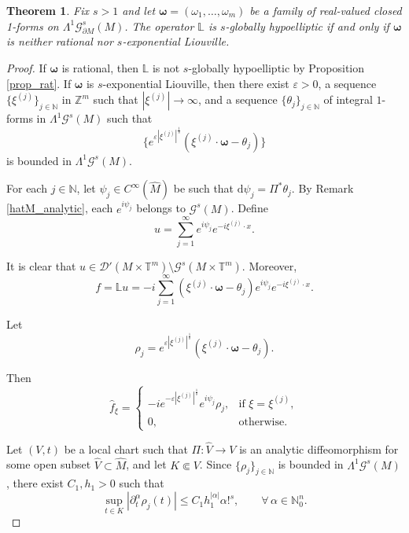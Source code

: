 \documentclass[11pt,reqno]{amsart}
\numberwithin{equation}{section}
\newtheorem{theorem}{Theorem}[section]
\begin{document}
\begin{theorem}\label{gh_roumieu}
	Fix $s>1$ and let $\boldsymbol{\omega}=(\omega_1,\dots,\omega_m)$ be a family of real-valued closed 1-forms on $\mathsf{\Lambda}^1\mathscr{G}^s_{\partial M}(M)$. The operator $\mathbb{L}$ is $s$-globally hypoelliptic 
	if and only if $\boldsymbol{\omega}$ is neither rational nor $s$-exponential Liouville.
\end{theorem}
\begin{proof}
	
	If $\boldsymbol{\omega}$ is rational, then $\mathbb{L}$ is not $s$-globally hypoelliptic by Proposition \ref{prop_rat}. 
	If $\boldsymbol{\omega}$ is $s$-exponential Liouville, then there exist $\varepsilon>0$, a sequence $\{\xi^{(j)}\}_{j\in\mathbb{N}}$ in $\mathbb{Z}^m$ such that $|\xi^{(j)}|\to\infty$, and a sequence $\{\theta_j\}_{j\in\mathbb{N}}$ of integral $1$-forms in $\mathsf{\Lambda}^1\mathscr{G}^s(M)$ such that 
	\[
	\{e^{\varepsilon|\xi^{(j)}|^{\frac{1}{s}}}(\xi^{(j)}\cdot\boldsymbol{\omega}-\theta_j)\}
	\]
	is bounded in $\mathsf{\Lambda}^1\mathscr{G}^s(M)$.
	
	For each $j\in\mathbb{N}$, let $\psi_j\in C^\infty(\hat M)$ be such that $\mathrm{d}\psi_j=\Pi^*\theta_j$. 
	By Remark \ref{hatM_analytic}, each $e^{i\psi_j}$ belongs to $\mathscr{G}^s(M)$. 
	Define
	\[
	u = \sum_{j=1}^{\infty} e^{i\psi_j}e^{-i\xi^{(j)}\cdot x}.
	\]
	
	It is clear that $u\in \mathscr{D}'(M\times\mathbb{T}^m)\setminus\mathscr{G}^s(M\times\mathbb{T}^m)$. Moreover,
	\[
	f=\mathbb{L}u 
	= -i\sum_{j=1}^\infty (\xi^{(j)}\cdot\boldsymbol{\omega}-\theta_j)e^{i\psi_j}e^{-i\xi^{(j)}\cdot x}.
	\]
	
	Let
	\[
	\rho_j = e^{\varepsilon|\xi^{(j)}|^{\frac{1}{s}}}(\xi^{(j)}\cdot\boldsymbol{\omega}-\theta_j).
	\]
	
	Then
	\[
	\widehat{f}_\xi = 
	\begin{cases}
		-ie^{-\varepsilon|\xi^{(j)}|^{\frac{1}{s}}}e^{i\psi_j}\rho_j,&\text{if } \xi=\xi^{(j)},\\
		0,&\text{otherwise}.
	\end{cases}
	\]
	
	Let $(V,t)$ be a local chart such that $\Pi:\hat V\to V$ is an analytic diffeomorphism for some open subset $\hat V\subset\hat M$, and let $K\Subset V$. 
	Since $\{\rho_j\}_{j\in\mathbb{N}}$ is bounded in $\mathsf{\Lambda}^1\mathscr{G}^s(M)$, there exist $C_1,h_1>0$ such that
	\[
	\sup_{t\in K}|\partial_t^\alpha\rho_j(t)|
	\leq C_1h_1^{|\alpha|}\alpha!^s,
	\qquad\forall\,\alpha\in\mathbb{N}_0^n.
	\]


\end{proof}
\end{document}
